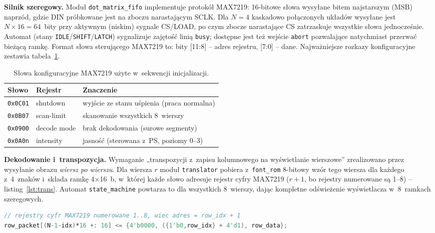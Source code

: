 \documentclass[12pt,a4paper]{article}
\begin{document}
\textbf{Silnik szeregowy.} Moduł \texttt{dot\_matrix\_fifo} implementuje
protokół MAX7219: 16-bitowe słowa wysyłane bitem najstarszym (MSB) naprzód,
gdzie DIN próbkowane jest na zboczu narastającym SCLK. Dla $N=4$ kaskadowo
połączonych układów wysyłane jest $N\times16=64$~bity przy aktywnym (niskim)
sygnale CS/LOAD, po czym zbocze narastające CS zatrzaskuje wszystkie słowa
jednocześnie. Automat (stany \texttt{IDLE}/\texttt{SHIFT}/\texttt{LATCH})
sygnalizuje zajętość linią \texttt{busy}; dostępne jest też wejście
\texttt{abort} pozwalające natychmiast przerwać bieżącą ramkę. Format słowa
sterującego MAX7219 to: bity [11:8] -- adres rejestru, [7:0] -- dane.
Najważniejsze rozkazy konfiguracyjne zestawia tabela~\ref{tab:max}.

\begin{table}[H]
\centering
\caption{Słowa konfiguracyjne MAX7219 użyte w~sekwencji inicjalizacji.}
\label{tab:max}
\small
\begin{tabularx}{\textwidth}{@{}l l X@{}}
\toprule
\textbf{Słowo} & \textbf{Rejestr} & \textbf{Znaczenie} \\
\midrule
\texttt{0x0C01} & shutdown    & wyjście ze stanu uśpienia (praca normalna) \\
\texttt{0x0B07} & scan-limit  & skanowanie wszystkich 8~wierszy \\
\texttt{0x0900} & decode mode & brak dekodowania (surowe segmenty) \\
\texttt{0x0A0n} & intensity   & jasność (sterowana z~PS, poziomy 0--3) \\
\bottomrule
\end{tabularx}
\end{table}

\textbf{Dekodowanie i~transpozycja.} Wymaganie „transpozycji z~zapisu
kolumnowego na wyświetlanie wierszowe” zrealizowano przez wysyłanie obrazu
\emph{wiersz po wierszu}. Dla wiersza $r$ moduł \texttt{translator} pobiera
z~\texttt{font\_rom} 8-bitowy wzór tego wiersza dla każdego z~4~znaków i~składa
ramkę 4$\times$16~b, w~której każde słowo adresuje rejestr cyfry MAX7219
($r{+}1$, bo rejestry numerowane są 1--8) -- listing~\ref{lst:trans}. Automat
\texttt{state\_machine} powtarza to dla wszystkich 8~wierszy, dając kompletne
odświeżenie wyświetlacza w~8~ramkach szeregowych.

\begin{lstlisting}[language=Verilog, caption={Złożenie słowa ramki w~module \texttt{translator}.}, label={lst:trans}]
// rejestry cyfr MAX7219 numerowane 1..8, wiec adres = row_idx + 1
row_packet[(N-1-idx)*16 +: 16] <= {4'b0000, ({1'b0,row_idx} + 4'd1), row_data};
\end{lstlisting}
\end{document}
